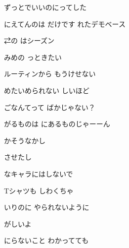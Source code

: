 \documentclass[a4paper,tate,twocolumn,12pt]{ltjtarticle}
\begin{document}
\thispagestyle{empty}

\begin{center}
{\LARGE {}}
\end{center}

\vspace{1em}

\begin{flushleft}

\noindent\begin{minipage}{\linewidth}
ずっとでいいのにってした

にえてんのは だけです れたデモベース

⇄の はシーズン

みめの っときたい
\end{minipage}

\vspace{2em}

\noindent\begin{minipage}{\linewidth}
ルーティンから もうけせない

めたいめられない しいほど

ごなんてって ばかじゃない？

がるものは にあるものじゃーーん
\end{minipage}

\vspace{2em}

\noindent\begin{minipage}{\linewidth}
かそうなかし

させたし

なキャラにはしないで

Tシャツも しわくちゃ

いりのに やられないように

がしいよ 

にらないこと わかってても


\end{minipage}
\end{flushleft}
\end{document}
